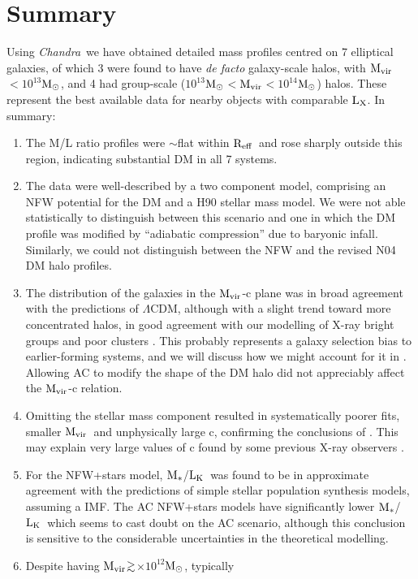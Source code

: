 \documentclass{emulateapj}
\def\spose#1{\hbox to 0pt{#1\hss}}
\def\gtsim{$\mathrel{\spose{\lower 3pt\hbox{$\sim$}} 
        \raise 2.0pt\hbox{$>$}}$\thinspace}
\def \msun {${\rm M_\odot}$}
\def \eg {e.g.}
\newcommand{\mvir}{${\rm M_{vir}}$}
\newcommand{\reff}{${\rm R_{eff}}$}
\newcommand{\mstars}{${\rm M_{*}}$}
\newcommand{\chandra }{{\em Chandra}}
\newcommand{\lcdm}{$\Lambda$CDM}
\newcommand{\lx }{${\rm L_X}$}
\newcommand{\lk }{${\rm L_K}$}
\begin{document}
\section{Summary}
Using \chandra\ we have obtained detailed mass profiles 
centred on 7 elliptical galaxies,
of which 3 were found to have {\em de facto} galaxy-scale halos,
with \mvir $< 10^{13}$\msun, and 4 had group-scale 
($10^{13}$\msun$<$\mvir$< 10^{14}$\msun) halos.
These represent the best available data for nearby objects 
with comparable \lx. In summary:
\begin{enumerate}
\item The M/L ratio profiles were $\sim$flat within \reff\ and rose sharply
outside this region, indicating substantial DM in all 7 systems.
\item The data were well-described by a two component model, comprising
an NFW potential for the DM and a H90 stellar mass model. 
We were not able statistically to distinguish
between this scenario and one  in which the DM profile was modified by ``adiabatic
compression'' due to baryonic infall. Similarly, we could not 
distinguish between the NFW and the revised N04 DM halo profiles.
\item The distribution of the galaxies in the \mvir-c plane was
in broad agreement with the predictions of \lcdm, although with a 
slight trend toward more concentrated halos, in good agreement
with our modelling of X-ray bright groups and poor clusters
\citep{gastaldello06a}. 
This probably represents a galaxy
selection bias to earlier-forming systems, 
and we will discuss how we might account for it 
in \citet{buote06b}. Allowing AC to modify the shape of the DM halo
did not appreciably affect the \mvir-c relation.
\item Omitting the stellar mass component resulted in 
systematically poorer fits, smaller \mvir\ and unphysically large c, 
confirming the  conclusions of \citet{mamon05a}. This may explain
very large values of c found by some previous X-ray observers
\citep[\eg][]{sato00a,khosroshahi04a}.
\item For the NFW+stars model,  \mstars/\lk\ was found to be
in approximate agreement with the predictions of simple stellar
population synthesis models, assuming a \citet{kroupa01a} IMF. The AC NFW+stars
models have significantly lower \mstars/\lk\ which seems to cast
doubt on the AC scenario, although this conclusion is sensitive to
the considerable uncertainties in the theoretical modelling.
\item Despite having \mvir \gtsim 5$\times 10^{12}$\msun, typically 

\end{enumerate}
\end{document}
